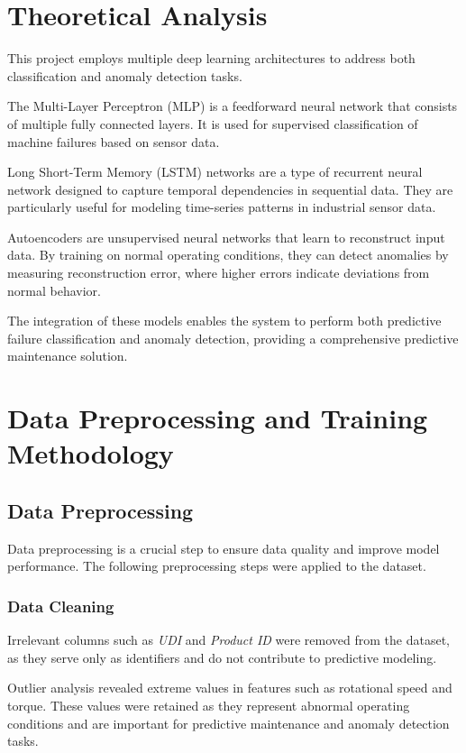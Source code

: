 \documentclass{ecsproject}     %
\begin{document}
\chapter{Theoretical Analysis}
This project employs multiple deep learning architectures to address both classification and anomaly detection tasks.

The Multi-Layer Perceptron (MLP) is a feedforward neural network that consists of multiple fully connected layers. It is used for supervised classification of machine failures based on sensor data.

Long Short-Term Memory (LSTM) networks are a type of recurrent neural network designed to capture temporal dependencies in sequential data. They are particularly useful for modeling time-series patterns in industrial sensor data.

Autoencoders are unsupervised neural networks that learn to reconstruct input data. By training on normal operating conditions, they can detect anomalies by measuring reconstruction error, where higher errors indicate deviations from normal behavior.

The integration of these models enables the system to perform both predictive failure classification and anomaly detection, providing a comprehensive predictive maintenance solution.

\chapter{Data Preprocessing and Training Methodology}
\section{Data Preprocessing}
Data preprocessing is a crucial step to ensure data quality and improve model performance. The following preprocessing steps were applied to the dataset.

\subsection{Data Cleaning}

Irrelevant columns such as \textit{UDI} and \textit{Product ID} were removed from the dataset, as they serve only as identifiers and do not contribute to predictive modeling.

Outlier analysis revealed extreme values in features such as rotational speed and torque. These values were retained as they represent abnormal operating conditions and are important for predictive maintenance and anomaly detection tasks.
\end{document}
